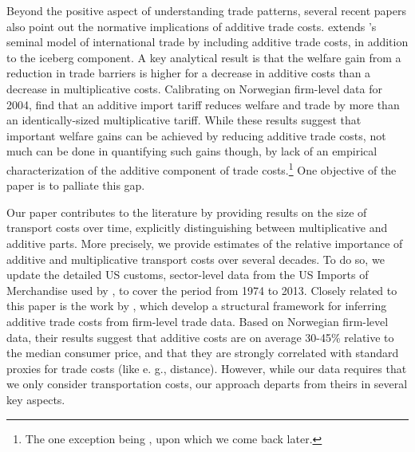 \documentclass[a4paper,11pt]{article}
\begin{document}

Beyond the positive aspect of understanding trade patterns, several recent papers also point out the normative implications of additive trade costs. \citealp{sorensen2014} extends \citet{melitz}'s seminal model of international trade by including additive trade costs, in addition to the iceberg component. A key analytical result is that the welfare gain from a reduction in trade barriers is higher for a decrease in additive costs than a decrease in multiplicative costs. Calibrating on Norwegian firm-level data for 2004, \citet{Irrazabal_2015} find that an additive import tariff reduces welfare and trade by more than an identically-sized multiplicative tariff. While these results suggest that important welfare gains can be achieved by reducing additive trade costs, not much can be done in quantifying such gains though, by lack of an empirical characterization of the additive component of trade costs.\footnote{The one exception being \citet{Irrazabal_2015}, upon which we come back later.} One objective of the paper is to palliate this gap. \bigskip


Our paper contributes to the literature by providing results on the size of transport costs over time, explicitly distinguishing between multiplicative and additive parts. More precisely, we provide estimates of the relative importance of additive and multiplicative transport costs over several decades. To do so, we update the detailed US customs, sector-level data from the US Imports of Merchandise used by \citet{hummels2007}, to cover the period from 1974 to 2013. Closely related to this paper is the work by \citet{Irrazabal_2015}, which develop a structural framework for inferring additive trade costs from firm-level trade data. Based on Norwegian firm-level data, their results suggest that additive costs are on average 30-45\% relative to the median consumer price, and that they are strongly correlated with standard proxies for trade costs (like e. g., distance). However, while our data requires that we only consider transportation costs, our approach departs from theirs in several key aspects.
\end{document}
